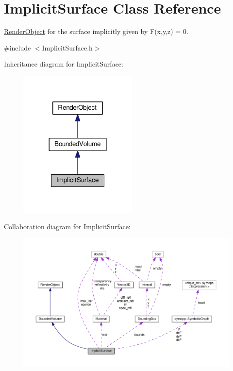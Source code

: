 \hypertarget{classImplicitSurface}{}\section{Implicit\+Surface Class Reference}
\label{classImplicitSurface}


\hyperlink{classRenderObject}{Render\+Object} for the surface implicitly given by F(x,y,z) = 0.  




{\ttfamily \#include $<$Implicit\+Surface.\+h$>$}



Inheritance diagram for Implicit\+Surface\+:\nopagebreak
\begin{figure}[H]
\begin{center}
\leavevmode
\includegraphics[width=168pt]{classImplicitSurface__inherit__graph}
\end{center}
\end{figure}


Collaboration diagram for Implicit\+Surface\+:\nopagebreak
\begin{figure}[H]
\begin{center}
\leavevmode
\includegraphics[width=350pt]{classImplicitSurface__coll__graph}
\end{center}
\end{figure}

